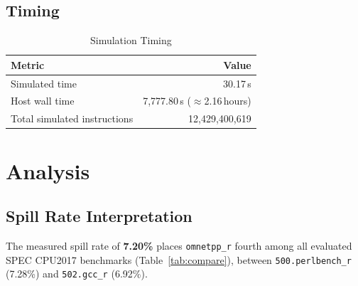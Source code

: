 \documentclass[conference]{IEEEtran}
\begin{document}
\subsection{Timing}

\begin{table}[H]
\centering
\caption{Simulation Timing}
\label{tab:timing}
\begin{tabular}{lr}
\toprule
\textbf{Metric} & \textbf{Value} \\
\midrule
Simulated time           & 30.17\,s \\
Host wall time           & 7{,}777.80\,s ($\approx$2.16\,hours) \\
Total simulated instructions & 12,429,400,619 \\
\bottomrule
\end{tabular}
\end{table}

\section{Analysis}

\subsection{Spill Rate Interpretation}

The measured spill rate of \textbf{7.20\%} places
\texttt{omnetpp\_r} fourth among all evaluated SPEC CPU2017
benchmarks (Table~\ref{tab:compare}), between
\texttt{500.perlbench\_r} (7.28\%) and \texttt{502.gcc\_r} (6.92\%).
\end{document}
